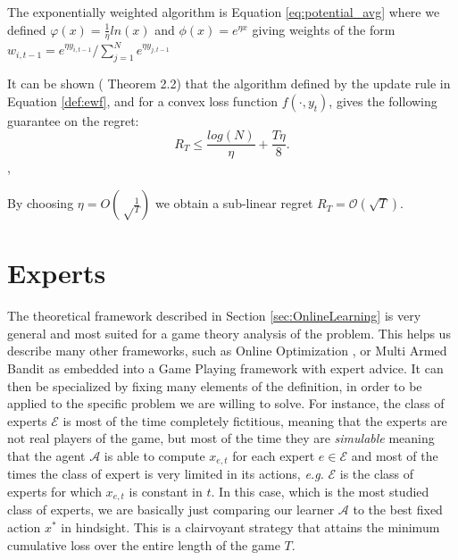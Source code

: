 \begin{definition}\label{def:ewf}
	The exponentially weighted algorithm is Equation \eqref{eq:potential_avg} where we defined $\varphi(x)=\frac{1}{\eta}ln(x)$ and $\phi(x)=e^{\eta x}$ giving weights of the form $w_{i,t-1}=e^{\eta y_{i,t-1}}/\sum\limits_{j=1}^Ne^{\eta y_{j,t-1}}$
\end{definition}

It can be shown (\cite{cesa2006prediction} Theorem 2.2) that the algorithm defined by the update rule in Equation \eqref{def:ewf}, and for a convex loss function $f(\cdot,y_t)$, gives the following guarantee on the regret:
\begin{equation}\label{eq:regret_ewf}
R_T\le \frac{log(N)}{\eta}+\frac{T\eta}{8}.
\end{equation},

By choosing $\eta=O\left(\sqrt\frac{1}{T}\right)$ we obtain a sub-linear regret $R_T=\mathcal O(\sqrt T)$. %



\section{Experts}
The theoretical framework described in Section \ref{sec:OnlineLearning} is very general and most suited for a game theory analysis of the problem. This helps us describe many other frameworks, such as Online Optimization \cite{hazan2016introduction}, or Multi Armed Bandit \cite{bubeck2012regret} as embedded into a Game Playing framework with expert advice. It can then be specialized by fixing many elements of the definition, in order to be applied to the specific problem we are willing to solve.
For instance, the class of experts $\mathcal E$ is most of the time completely fictitious, meaning that the experts are not real players of the game, but most of the time they are \emph{simulable} meaning that the agent $\mathcal A$ is able to compute $x_{e,t}$ for each expert $e\in\mathcal E$ and most of the times the class of expert is very limited in its actions, \emph{e.g.} $\mathcal E$ is the class of experts for which $x_{e,t}$ is constant in $t$. In this case, which is the most studied class of experts, we are basically just comparing our learner $\mathcal A$ to the best fixed action $x^*$ in hindsight. This is a clairvoyant strategy that attains the minimum cumulative loss over the entire length of the game $T$.

